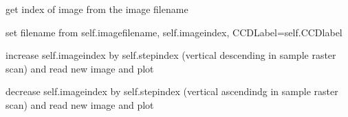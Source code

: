 \documentclass[letterpaper,10pt,english]{sphinxmanual}
\begin{document}
\begin{fulllineitems}
\begin{fulllineitems}
\end{fulllineitems}


\begin{fulllineitems}
\label{\detokenize{PeakSearchGUI:LaueTools.GUI.PeakSearchGUI.MainPeakSearchFrame.getIndex_fromfilename}}
get index of image from the image filename

\end{fulllineitems}


\begin{fulllineitems}
\label{\detokenize{PeakSearchGUI:LaueTools.GUI.PeakSearchGUI.MainPeakSearchFrame.setfilename}}
set filename from self.imagefilename, self.imageindex,
CCDLabel=self.CCDlabel

\end{fulllineitems}


\begin{fulllineitems}
\label{\detokenize{PeakSearchGUI:LaueTools.GUI.PeakSearchGUI.MainPeakSearchFrame.OnLargePlus}}
increase self.imageindex by self.stepindex (vertical descending in sample raster scan)
and read new image and plot

\end{fulllineitems}


\begin{fulllineitems}
\label{\detokenize{PeakSearchGUI:LaueTools.GUI.PeakSearchGUI.MainPeakSearchFrame.OnLargeMinus}}
decrease self.imageindex by self.stepindex (vertical ascendindg in sample raster scan)
and read new image and plot

\end{fulllineitems}



\end{fulllineitems}
\end{document}
